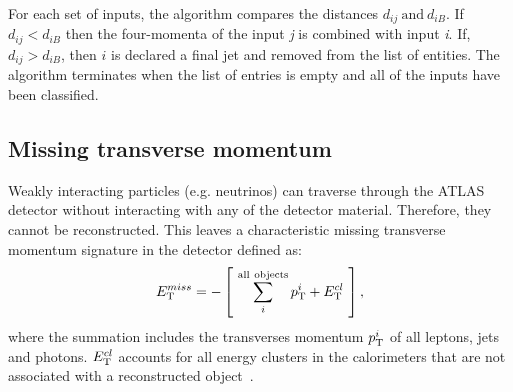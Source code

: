For each set of inputs, the algorithm compares the distances $d_{ij}~\mathrm{and}~d_{iB}$. If $d_{ij} < d_{iB}$ then the four-momenta of the input \emph{j} is combined with input \emph{i}. If, $d_{ij} > d_{iB}$, then $i$ is declared a final jet and removed from the list of entities. The algorithm terminates when the list of entries is empty and all of the inputs have been classified. 


\subsection{Missing transverse momentum}
Weakly interacting particles (e.g. neutrinos) can traverse through the ATLAS detector without interacting with any of the detector material. Therefore, they cannot be reconstructed. This leaves a characteristic missing transverse momentum signature in the detector defined as: 
\begin{equation}
   E_{\text{T}}^{miss} = - \left[ ~\sum^{\mathrm{all ~objects}}_i p_{\text{T}}^i + E_{\text{T}}^{cl}~ \right],
\end{equation}
where the summation includes the transverses momentum $p_{\text{T}}^i$ of all leptons, jets and photons. $E_{\text{T}}^{cl}$ accounts for all energy clusters in the calorimeters that are not associated with a reconstructed object~\cite{ATL-PHYS-PUB-2015-027}.

\clearpage